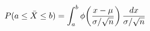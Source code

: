 \documentclass[preview]{standalone}
\begin{document}
\begin{align*}
\special{dvisvgm:raw <g id='unique000'>}P(a \leq \bar{X} \leq b) \special{dvisvgm:raw </g>}\special{dvisvgm:raw <g id='unique001'>}= \int_{a}^{b} \phi\!\left(\frac{x-\mu}{\sigma/\sqrt{n}}\right)\frac{dx}{\sigma/\sqrt{n}}\special{dvisvgm:raw </g>}
\end{align*}
\end{document}
